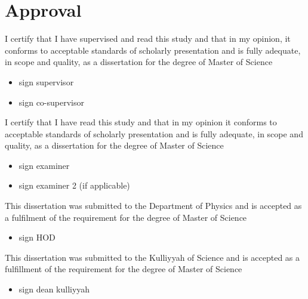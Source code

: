 \section*{Approval}

\noindent I certify that I have supervised and read this study and that in my opinion, it conforms to acceptable standards of scholarly presentation and is fully adequate, in scope and quality, as a dissertation for the degree of Master of Science 

\begin{itemize}
    \item sign supervisor
    \item sign co-supervisor
\end{itemize}

\noindent I certify that I have read this study and that in my opinion it conforms to acceptable standards of scholarly presentation and is fully adequate, in scope and quality, as a dissertation for the degree of Master of Science

\begin{itemize}
    \item sign examiner
    \item sign examiner 2 (if applicable)
\end{itemize}

\noindent This dissertation was submitted to the Department of Physics and is accepted as a fulfilment of the requirement for the degree of Master of Science

\begin{itemize}
    \item sign HOD
\end{itemize}

\noindent This dissertation was submitted to the Kulliyyah of Science and is accepted as a
fulfillment of the requirement for the degree of Master of Science

\begin{itemize}
    \item sign dean kulliyyah
\end{itemize}